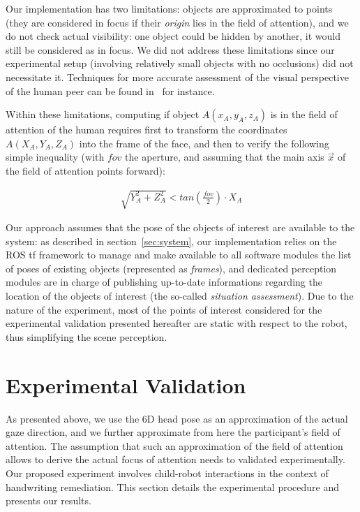\documentclass{sig-alternate}
\begin{document}
Our implementation has two limitations: objects are approximated to points (they
are considered in focus if their \emph{origin} lies in the field of attention),
and we do not check actual visibility: one object could be hidden by another, it
would still be considered as in focus. We did not address these limitations
since our experimental setup (involving relatively small objects with no
occlusions) did not necessitate it. Techniques for more accurate assessment of
the visual perspective of the human peer can be found
in~\cite{sisbot2011situation} for instance.

Within these limitations, computing if object $A(x_A,y_A,z_A)$ is in the field
of attention of the human requires first to transform the coordinates
$A(X_A,Y_A,Z_A)$ into the frame of the face, and then to verify the following
simple inequality (with $fov$ the aperture, and assuming that the main axis
$\vec{x}$ of the field of attention points forward):

\begin{align}
    \sqrt{Y_A^2 + Z_A^2} < tan\left(\frac{fov}{2}\right) \cdot X_A
\label{eq:fov}
\end{align}

Our approach assumes that the pose of the objects of interest are available to
the system: as described in section~\ref{sec:system}, our implementation relies
on the ROS {\sc tf} framework to manage and make available to all software
modules the list of poses of existing objects (represented as {\it frames}), and
dedicated perception modules are in charge of publishing up-to-date informations
regarding the location of the objects of interest (the so-called \emph{situation
assessment}). Due to the nature of the experiment, most of the points of
interest considered for the experimental validation presented hereafter are
static with respect to the robot, thus simplifying the scene perception.


\section{Experimental Validation}
\label{sec:expe}

As presented above, we use the 6D head pose as an approximation of the actual
gaze direction, and we further approximate from here the participant's field of
attention. The assumption that such an approximation of the field of attention
allows to derive the actual focus of attention needs to validated
experimentally.  Our proposed experiment involves child-robot interactions in
the context of handwriting remediation.  This section details the experimental
procedure and presents our results.
\end{document}
